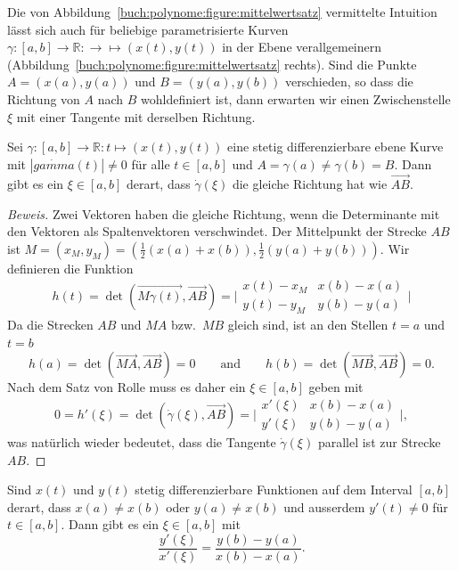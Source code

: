 Die von Abbildung~\ref{buch:polynome:figure:mittelwertsatz} vermittelte
Intuition lässt sich auch für beliebige parametrisierte Kurven
$\gamma\colon[a,b]\to\mathbb R:\to\mapsto (x(t),y(t))$ in der Ebene
verallgemeinern (Abbildung~\ref{buch:polynome:figure:mittelwertsatz} rechts).
Sind die Punkte $A=(x(a),y(a))$ und $B=(y(a),y(b))$ verschieden,
so dass die Richtung von $A$ nach $B$ wohldefiniert ist, dann erwarten
wir einen Zwischenstelle $\xi$ mit einer Tangente mit derselben Richtung.

\begin{satz}
\label{buch:satz:mittelwertsatz2d}
Sei $\gamma\colon[a,b]\to\mathbb R:t\mapsto (x(t),y(t))$ eine
stetig differenzierbare ebene Kurve mit $|\dot{gamma}(t)|\ne 0$ für
alle $t\in[a,b]$ und $A=\gamma(a)\ne\gamma(b)=B$.
Dann gibt es ein $\xi\in[a,b]$ derart, dass $\dot{\gamma}(\xi)$ die gleiche
Richtung hat wie $\overrightarrow{AB}$.
\end{satz}

\begin{proof}[Beweis]
Zwei Vektoren haben die gleiche Richtung, wenn die Determinante
mit den Vektoren als Spaltenvektoren verschwindet.
Der Mittelpunkt der Strecke $AB$ ist
$M=(x_M,y_M) = (\frac12(x(a)+x(b)),\frac12(y(a)+y(b)))$.
Wir definieren die Funktion
\[
h(t)
=
\det(\overrightarrow{M\gamma(t)}, \overrightarrow{AB})
=
\biggl|
\begin{matrix}
x(t) - x_M & x(b)-x(a) \\
y(t) - y_M & y(b)-y(a)
\end{matrix}
\biggr|
\]
Da die Strecken $AB$ und $MA$ bzw.~$MB$ gleich sind, ist an den
Stellen $t=a$ und $t=b$ 
\[
h(a)
=
\det (\overrightarrow{MA},\overrightarrow{AB})
= 0
\qquad\text{and}\qquad
h(b)
=
\det (\overrightarrow{MB},\overrightarrow{AB})
=
0.
\]
Nach dem Satz von Rolle muss es daher ein $\xi\in[a,b]$ geben mit
\begin{equation}
0
=
h'(\xi)
=
\det(
\dot{\gamma}(\xi),
\overrightarrow{AB}
)
=
\biggl|
\begin{matrix}
x'(\xi) & x(b)-x(a) \\
y'(\xi) & y(b)-y(a)
\end{matrix}
\biggr|,
\label{buch:polynome:eqn:mittelwertsatz2d}
\end{equation}
was natürlich wieder bedeutet, dass die Tangente $\dot{\gamma}(\xi)$ 
parallel ist zur Strecke $AB$.
\end{proof}


\begin{satz}
\label{buch:satz:vmittelwertsatz}
Sind $x(t)$ und $y(t)$ stetig differenzierbare Funktionen auf dem Interval
$[a,b]$ derart, dass $x(a)\ne x(b)$ oder $y(a)\ne x(b)$ und ausserdem
$y'(t)\ne 0$ für $t\in[a,b]$.
Dann gibt es ein $\xi\in[a,b]$ mit
\[
\frac{y'(\xi)}{x'(\xi)}
=
\frac{y(b)-y(a)}{x(b)-x(a)}.
\]
\end{satz}

